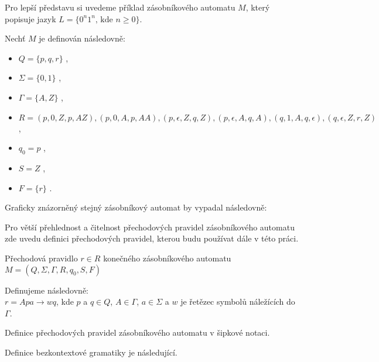 Pro lepší představu si uvedeme příklad zásobníkového automatu \(M\), který popisuje jazyk \( L = \{ 0^n 1^n \text{, kde } n \geq 0 \} \).

Nechť \(M\) je definován následovně:  
\begin{itemize}
	\item \( Q = \{ p, q, r\} \) ,
	\item \( \Sigma = \{0, 1\} \) ,
	\item \( \Gamma =  \{A, Z\}\) ,
	\item \( R = (p, 0, Z, p, AZ) , (p,0,A,p,AA), (p,\epsilon,Z,q,Z), (p,\epsilon,A,q,A), (q,1,A,q,\epsilon), (q,\epsilon,Z,r,Z) \),
	\item \( q_0 = p\) ,
	\item \( S = Z \) ,
	\item \( F = \{r\} \) .
\end{itemize}

Graficky znázorněný stejný zásobníkový automat by vypadal následovně:



Pro větší přehlednost a čitelnost přechodových pravidel zásobníkového automatu zde uvedu definici přechodových pravidel, kterou budu používat dále v této práci.

\begin{framed}
	\begin{flushleft}Přechodová pravidlo $r \in R$ konečného zásobníkového automatu \( M = (Q, \Sigma, \Gamma, R, q_0, S, F) \)\end{flushleft} 
	Definujeme následovně: \\
	\( r = A p a \rightarrow w q \), kde $p$ a $ q \in Q$, $A \in \Gamma$, $a \in \Sigma$ a $w$ je řetězec symbolů náležících do $\Gamma$.
\end{framed}
\begin{mydef}
	Definice přechodových pravidel zásobníkového automatu v šipkové notaci.
\end{mydef}


Definice bezkontextové gramatiky je následující.


